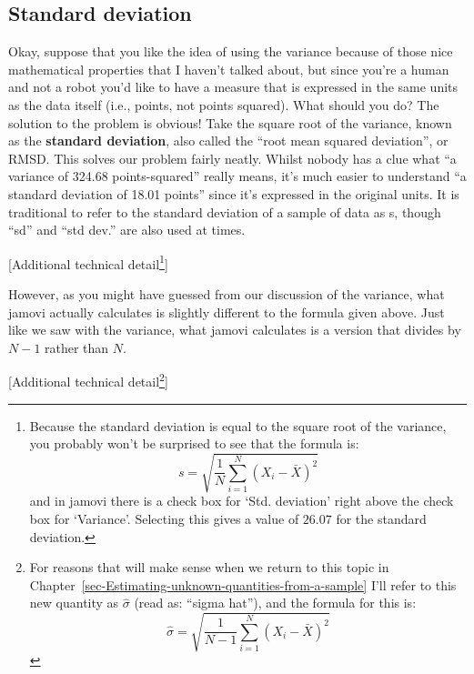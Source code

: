 \documentclass[
  a4paper,
]{book}
\begin{document}
\hypertarget{sec-Standard-deviation}{%
\subsection{Standard deviation}\label{sec-Standard-deviation}}

Okay, suppose that you like the idea of using the variance because of
those nice mathematical properties that I haven't talked about, but
since you're a human and not a robot you'd like to have a measure that
is expressed in the same units as the data itself (i.e., points, not
points squared). What should you do? The solution to the problem is
obvious! Take the square root of the variance, known as the
\textbf{standard deviation}, also called the ``root mean squared
deviation'', or RMSD. This solves our problem fairly neatly. Whilst
nobody has a clue what ``a variance of 324.68 points-squared'' really
means, it's much easier to understand ``a standard deviation of 18.01
points'' since it's expressed in the original units. It is traditional
to refer to the standard deviation of a sample of data as s, though
``sd'' and ``std dev.'' are also used at times.

{[}Additional technical detail\footnote{Because the standard deviation
  is equal to the square root of the variance, you probably won't be
  surprised to see that the formula is:
  \[s=\sqrt{\frac{1}{N} \sum_{i=1}^{N} ( X_i - \bar{X} )^2 }\] and in
  jamovi there is a check box for `Std. deviation' right above the check
  box for `Variance'. Selecting this gives a value of \(26.07\) for the
  standard deviation.}{]}

However, as you might have guessed from our discussion of the variance,
what jamovi actually calculates is slightly different to the formula
given above. Just like we saw with the variance, what jamovi calculates
is a version that divides by \(N - 1\) rather than \(N\).

{[}Additional technical detail\footnote{For reasons that will make sense
  when we return to this topic in
  Chapter~\ref{sec-Estimating-unknown-quantities-from-a-sample} I'll
  refer to this new quantity as \(\hat{\sigma}\) (read as: ``sigma
  hat''), and the formula for this is:
  \[\hat{\sigma}=\sqrt{\frac{1}{N-1} \sum_{i=1}^{N} ( X_i - \bar{X} )^2}\]}{]}
\end{document}
